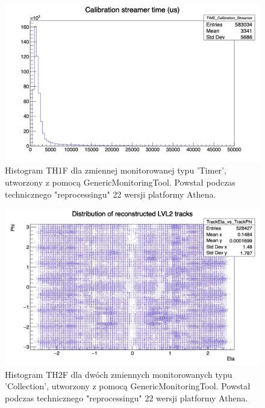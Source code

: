 \begin{figure}[!ht]
\centering
\includegraphics[width=1\textwidth]{img/histogram_TH1_time.png}
\caption{
Histogram TH1F dla zmiennej monitorowanej typu 'Timer', utworzony z pomocą GenericMonitoringTool. Powstał podczas technicznego "reprocessingu" 22 wersji platformy Athena.
}
\label{fig:athena:histogram_TH1_time}
\end{figure}

\begin{figure}[!ht]
\centering
\includegraphics[width=1\textwidth]{img/histogram_TH2.png}
\caption{
Histogram TH2F dla dwóch zmiennych monitorowanych typu 'Collection', utworzony z pomocą GenericMonitoringTool. Powstał podczas technicznego "reprocessingu" 22 wersji platformy Athena.
}
\label{fig:athena:histogram_TH2}
\end{figure}

